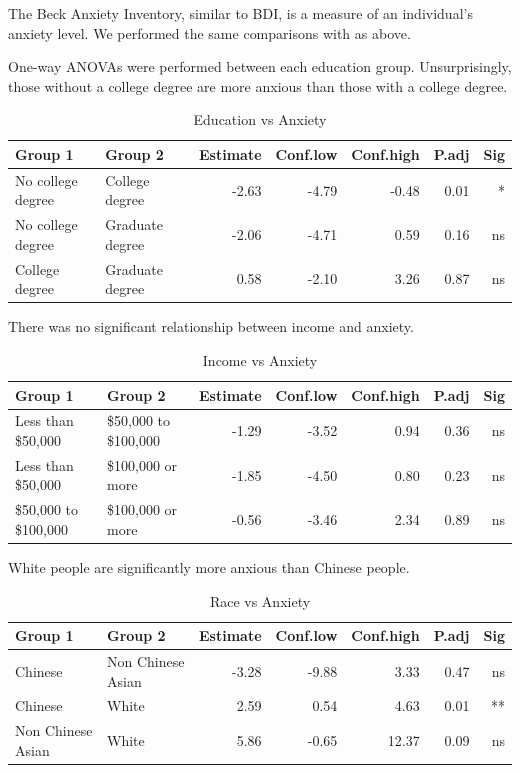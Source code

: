 \documentclass{article}
\begin{document}
\bigskip

The Beck Anxiety Inventory, similar to BDI, is a measure of an individual's anxiety level. We performed the same comparisons with as above.

\bigskip
\noindent
One-way ANOVAs were performed between each education group. Unsurprisingly, those without a college degree are more anxious than those with a college degree.

\begin{table}[ht]
\centering
\caption{Education vs Anxiety} \label{tab:title}
\begin{tabular}{llrrrrr}
  \hline
Group 1 & Group 2 & Estimate & Conf.low & Conf.high & P.adj & Sig \\ 
  \hline
No college degree & College degree & -2.63 & -4.79 & -0.48 & 0.01 & * \\ 
No college degree & Graduate degree & -2.06 & -4.71 & 0.59 & 0.16 & ns \\ 
College degree & Graduate degree & 0.58 & -2.10 & 3.26 & 0.87 & ns \\ 
   \hline
\end{tabular}
\end{table}

\bigskip
\bigskip
\noindent
There was no significant relationship between income and anxiety.

\begin{table}[ht]
\centering
\caption{Income vs Anxiety} \label{tab:title}
\begin{tabular}{llrrrrr}
  \hline
Group 1 & Group 2 & Estimate & Conf.low & Conf.high & P.adj & Sig \\ 
  \hline
Less than \$50,000 & \$50,000 to \$100,000 & -1.29 & -3.52 & 0.94 & 0.36 & ns \\ 
Less than \$50,000 & \$100,000 or more& -1.85 & -4.50 & 0.80 & 0.23 & ns \\ 
\$50,000 to \$100,000 & \$100,000 or more & -0.56 & -3.46 & 2.34 & 0.89 & ns \\ 
   \hline
\end{tabular}
\end{table}

\bigskip
\bigskip

\noindent
White people are significantly more anxious than Chinese people.

\begin{table}[ht]
\centering
\caption{Race vs Anxiety} \label{tab:title}
\begin{tabular}{llrrrrr}
  \hline
Group 1 & Group 2 & Estimate & Conf.low & Conf.high & P.adj & Sig \\ 
\hline
Chinese & Non Chinese Asian & -3.28 & -9.88 & 3.33 & 0.47 & ns \\ 
Chinese & White & 2.59 & 0.54 & 4.63 & 0.01 & ** \\ 
Non Chinese Asian & White & 5.86 & -0.65 & 12.37 & 0.09 & ns \\ 
   \hline
\end{tabular}
\end{table}
\end{document}
